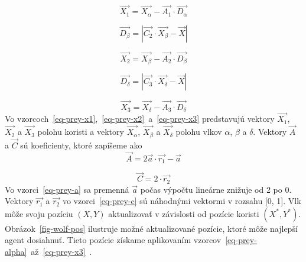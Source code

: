 \documentclass[a4paper,slovak,12pt,appendix]{article}
\begin{document}
\begin{equation}
  \vec{X_1} = \vec{X_\alpha} - \vec{A_1} \cdot \vec{D_\alpha}
  \label{eq-prey-x1}
\end{equation}

\begin{equation}
  \vec{D_\beta} = | \vec{C_2} \cdot \vec{X_\beta} - \vec{X} |
  \label{eq-prey-beta}
\end{equation}

\begin{equation}
  \vec{X_2} = \vec{X_\beta} - \vec{A_2} \cdot \vec{D_\beta}
  \label{eq-prey-x2}
\end{equation}

\begin{equation}
  \vec{D_\delta} = | \vec{C_3} \cdot \vec{X_\delta} - \vec{X} |
  \label{eq-prey-delta}
\end{equation}

\begin{equation}
  \vec{X_3} = \vec{X_\delta} - \vec{A_3} \cdot \vec{D_\delta}
  \label{eq-prey-x3}
\end{equation}
Vo vzorcoch~\ref{eq-prey-x1},~\ref{eq-prey-x2}~a~\ref{eq-prey-x3} predstavujú
vektory $\vec{X_1}$, $\vec{X_2}$ a $\vec{X_3}$ polohu koristi a vektory
$\vec{X_\alpha}$, $\vec{X_\beta}$ a $\vec{X_\delta}$ polohu vlkov
$\alpha$, $\beta$ a $\delta$. Vektory $\vec{A}$ a $\vec{C}$ sú koeficienty,
ktoré zapíšeme ako
\begin{equation}
  \vec{A} = 2\vec{a} \cdot \vec{r_1} - \vec{a}
  \label{eq-prey-a}
\end{equation}

\begin{equation}
  \vec{C} = 2 \cdot \vec{r_2}
  \label{eq-prey-c}
\end{equation}
Vo vzorci~\ref{eq-prey-a} sa premenná $\vec{a}$ počas výpočtu lineárne
znižuje od 2 po 0. Vektory $\vec{r_1}$ a $\vec{r_2}$ vo vzorci~\ref{eq-prey-c}
sú náhodnými vektormi v rozsahu [0, 1]. Vlk môže svoju pozíciu $(X, Y)$
aktualizovať v závislosti od pozície koristi $(X^*, Y^*)$.
Obrázok~\ref{fig-wolf-pos} ilustruje možné aktualizované pozície, ktoré môže
najlepší agent dosiahnuť. Tieto pozície získame aplikovaním
vzorcov~\ref{eq-prey-alpha}~až~\ref{eq-prey-x3}~\cite{Seeley1991}.
\end{document}
